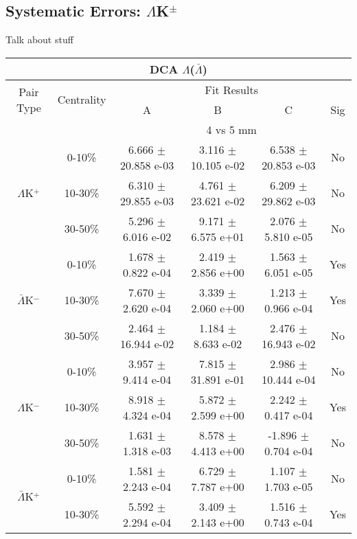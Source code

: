 \documentclass[../AnalysisNoteJBuxton.tex]{subfiles}
\begin{document}
\subsection{Systematic Errors: \texorpdfstring{$\Lambda$K$^{\pm}$}{TEXT}}
\label{SysErrsLamKch}

Talk about stuff


\begin{table}
 \centering
 \begin{tabular}{|c|c|c|c|c|c|}
  \multicolumn{6}{c}{DCA $\Lambda$($\bar{\Lambda}$)} \\
  \hline
  \multirow{2}{*}{Pair Type} & \multirow{2}{*}{Centrality} & \multicolumn{4}{c|}{Fit Results} \\
  \cline{3-6}
   & & A & B & C & Sig \\  
  \hline
  \multicolumn{2}{|c}{} & \multicolumn{4}{c|}{4 vs 5 mm} \\  
  \hline  
  \multirow{3}{*}{$\Lambda$K$^{+}$}
   &  0-10\% & 6.666 $\pm$ 20.858 e-03 & 3.116 $\pm$ 10.105 e-02 & 6.538 $\pm$ 20.853 e-03 & No \\
   & 10-30\% & 6.310 $\pm$ 29.855 e-03 & 4.761 $\pm$ 23.621 e-02 & 6.209 $\pm$ 29.862 e-03 & No \\
   & 30-50\% & 5.296 $\pm$ 6.016 e-02 & 9.171 $\pm$ 6.575 e+01 & 2.076 $\pm$ 5.810 e-05 & No \\
  \hline
  \multirow{3}{*}{$\bar{\Lambda}$K$^{-}$}  
   &  0-10\% & 1.678 $\pm$ 0.822 e-04 & 2.419 $\pm$ 2.856 e+00 & 1.563 $\pm$ 6.051 e-05 & Yes \\
   & 10-30\% & 7.670 $\pm$ 2.620 e-04 & 3.339 $\pm$ 2.060 e+00 & 1.213 $\pm$ 0.966 e-04 & Yes \\
   & 30-50\% & 2.464 $\pm$ 16.944 e-02 & 1.184 $\pm$ 8.633 e-02 & 2.476 $\pm$ 16.943 e-02 & No \\
  \hline \hline
  \multirow{3}{*}{$\Lambda$K$^{-}$}
   &  0-10\% & 3.957 $\pm$ 9.414 e-04 & 7.815 $\pm$ 31.891 e-01 & 2.986 $\pm$ 10.444 e-04 & No \\
   & 10-30\% & 8.918 $\pm$ 4.324 e-04 & 5.872 $\pm$ 2.599 e+00 & 2.242 $\pm$ 0.417 e-04 & Yes \\
   & 30-50\% & 1.631 $\pm$ 1.318 e-03 & 8.578 $\pm$ 4.413 e+00 & -1.896 $\pm$ 0.704 e-04 & No \\
  \hline
  \multirow{3}{*}{$\bar{\Lambda}$K$^{+}$}  
   &  0-10\% & 1.581 $\pm$ 2.243 e-04 & 6.729 $\pm$ 7.787 e+00 & 1.107 $\pm$ 1.703 e-05 & No \\
   & 10-30\% & 5.592 $\pm$ 2.294 e-04 & 3.409 $\pm$ 2.143 e+00 & 1.516 $\pm$ 0.743 e-04 & Yes \\

\end{tabular}
\end{table}
\end{document}
